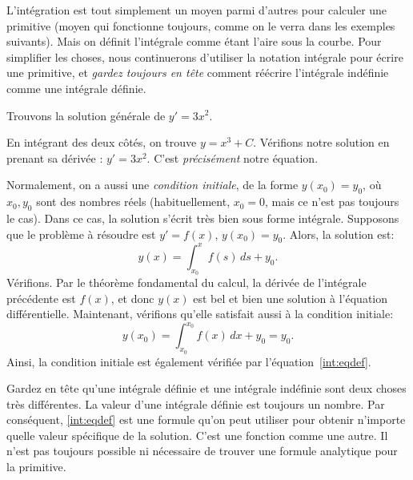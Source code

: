 L'intégration est tout simplement un moyen parmi d'autres pour calculer une primitive
(moyen qui fonctionne toujours, comme on le verra dans les exemples suivants).
Mais on définit l'intégrale comme étant l'aire sous la courbe.
Pour simplifier les choses, nous continuerons d'utiliser la notation intégrale pour écrire une primitive,
et \emph{gardez toujours en tête} comment réécrire l'intégrale indéfinie comme une intégrale définie.

\begin{example}
	Trouvons la solution générale de $y' = 3 x^2$.

	En intégrant des deux côtés, on trouve $y = x^3 + C$.  Vérifions notre solution en prenant sa dérivée :
	$y' = 3x^2$.  C'est \emph{précisément} notre équation.
\end{example}

Normalement, on a aussi une {\em condition initiale}, de la forme $y(x_0) = y_0$, où $x_0,y_0$ sont des nombres réels (habituellement, $x_0=0$, mais ce n'est pas toujours le cas).
Dans ce cas, la solution s'écrit très bien sous forme intégrale.
Supposons que le problème à résoudre est $y' = f(x)$, $y(x_0) = y_0$. Alors, la solution est:
%
\begin{equation} \label{int:eqdef}
	y(x) = \int_{x_0}^x f(s) \,ds + y_0 .
\end{equation}
Vérifions.  Par le théorème fondamental du calcul, la dérivée de l'intégrale précédente est $f(x)$,
et donc $y(x)$ est bel et bien une solution à l'équation différentielle.
Maintenant, vérifions qu'elle satisfait aussi à la condition initiale:
\begin{equation*}
	y(x_0) = \int_{x_0}^{x_0} f(x)\,dx + y_0 = y_0.
\end{equation*}
Ainsi, la condition initiale est également vérifiée par l'équation~\eqref{int:eqdef}.

Gardez en tête qu'une intégrale définie et une intégrale indéfinie sont deux choses très différentes.
La valeur d'une intégrale définie est toujours un nombre.
Par conséquent, \eqref{int:eqdef} est une formule qu'on peut utiliser pour obtenir n'importe quelle valeur spécifique de la solution.
C'est une fonction comme une autre.  Il n'est pas toujours possible ni nécessaire de trouver une formule analytique pour la primitive.



